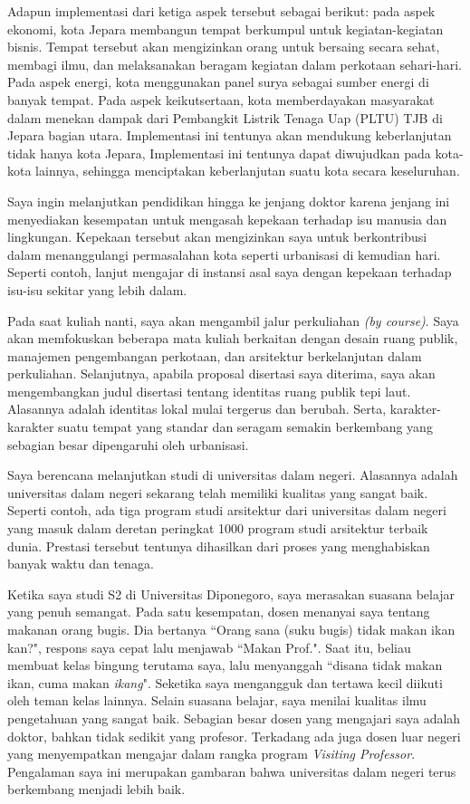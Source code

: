 \documentclass[../main.tex]{subfiles}
\begin{document}
Adapun implementasi dari ketiga aspek tersebut sebagai berikut: pada aspek ekonomi, kota Jepara membangun tempat berkumpul untuk kegiatan-kegiatan bisnis. Tempat tersebut akan mengizinkan orang untuk bersaing secara sehat, membagi ilmu, dan melaksanakan beragam kegiatan dalam perkotaan sehari-hari. Pada aspek energi, kota menggunakan panel surya sebagai sumber energi di banyak tempat. Pada aspek keikutsertaan, kota memberdayakan masyarakat dalam menekan dampak dari Pembangkit Listrik Tenaga Uap (PLTU) TJB di Jepara bagian utara. Implementasi ini tentunya akan mendukung keberlanjutan tidak hanya kota Jepara, Implementasi ini tentunya dapat diwujudkan pada kota-kota lainnya, sehingga menciptakan keberlanjutan suatu kota secara keseluruhan.

Saya ingin melanjutkan pendidikan hingga ke jenjang doktor karena jenjang ini menyediakan kesempatan untuk mengasah kepekaan terhadap isu manusia dan lingkungan. Kepekaan tersebut akan mengizinkan saya untuk berkontribusi dalam menanggulangi permasalahan kota seperti urbanisasi di kemudian hari. Seperti contoh, lanjut mengajar di instansi asal saya dengan kepekaan terhadap isu-isu sekitar yang lebih dalam.

Pada saat kuliah nanti, saya akan mengambil jalur perkuliahan \textit{(by course)}. Saya akan memfokuskan beberapa mata kuliah berkaitan dengan desain ruang publik, manajemen pengembangan perkotaan, dan arsitektur berkelanjutan dalam perkuliahan. Selanjutnya, apabila proposal disertasi saya diterima, saya akan mengembangkan judul disertasi tentang identitas ruang publik tepi laut. Alasannya adalah identitas lokal mulai tergerus dan berubah. Serta, karakter-karakter suatu tempat yang standar dan seragam semakin berkembang yang sebagian besar dipengaruhi oleh urbanisasi.

Saya berencana melanjutkan studi di universitas dalam negeri. Alasannya adalah universitas dalam negeri sekarang telah memiliki kualitas yang sangat baik. Seperti contoh, ada tiga program studi arsitektur dari universitas dalam negeri yang masuk dalam deretan peringkat 1000 program studi arsitektur terbaik dunia. Prestasi tersebut tentunya dihasilkan dari proses yang menghabiskan banyak waktu dan tenaga.

Ketika saya studi S2 di Universitas Diponegoro, saya merasakan suasana belajar yang penuh semangat. Pada satu kesempatan, dosen menanyai saya tentang makanan orang bugis. Dia bertanya ``Orang sana (suku bugis) tidak makan ikan kan?", respons saya cepat lalu menjawab ``Makan Prof.". Saat itu, beliau membuat kelas bingung terutama saya, lalu menyanggah ``disana tidak makan ikan, cuma makan \textit{ikang}". Seketika saya mengangguk dan tertawa kecil diikuti oleh teman kelas lainnya. Selain suasana belajar, saya menilai kualitas ilmu pengetahuan yang sangat baik. Sebagian besar dosen yang mengajari saya adalah doktor, bahkan tidak sedikit yang profesor. Terkadang ada juga dosen luar negeri yang menyempatkan mengajar dalam rangka program \textit{Visiting Professor}. Pengalaman saya ini merupakan gambaran bahwa universitas dalam negeri terus berkembang menjadi lebih baik.
\end{document}
